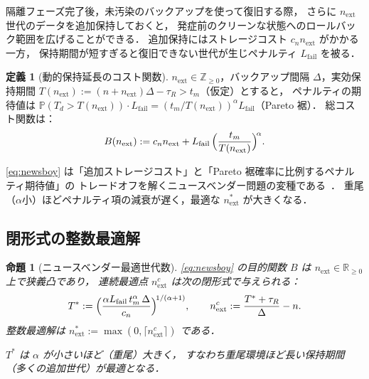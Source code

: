 \documentclass[12pt,a4paper]{article}
\theoremstyle{plain}
\newtheorem{proposition}[theorem]{命題}
\theoremstyle{definition}
\newtheorem{definition}[theorem]{定義}
\theoremstyle{remark}
\newcommand{\Prob}{\mathbb{P}}
\newcommand{\Z}{\mathbb{Z}}
\begin{document}
隔離フェーズ完了後，未汚染のバックアップを使って復旧する際，
さらに $n_{\mathrm{ext}}$ 世代のデータを追加保持しておくと，
発症前のクリーンな状態へのロールバック範囲を広げることができる．
追加保持にはストレージコスト $c_n n_{\mathrm{ext}}$ がかかる一方，
保持期間が短すぎると復旧できない世代が生じペナルティ $L_{\mathrm{fail}}$ を被る．

\begin{definition}[動的保持延長のコスト関数]\label{def:newsboy}
$n_{\mathrm{ext}}\in\Z_{\ge0}$，バックアップ間隔 $\Delta$，実効保持期間
$T(n_{\mathrm{ext}}):=(n+n_{\mathrm{ext}})\Delta-\tau_R>t_m$（仮定）とすると，
ペナルティの期待値は $\Prob(T_d>T(n_{\mathrm{ext}}))\cdot L_{\mathrm{fail}}=(t_m/T(n_{\mathrm{ext}}))^\alpha L_{\mathrm{fail}}$（Pareto 裾）．
総コスト関数は：
\begin{equation}\label{eq:newsboy}
B(n_{\mathrm{ext}}):=c_n n_{\mathrm{ext}}+L_{\mathrm{fail}}\,\Bigl(\frac{t_m}{T(n_{\mathrm{ext}})}\Bigr)^{\!\alpha}.
\end{equation}
\end{definition}

\eqref{eq:newsboy} は「追加ストレージコスト」と「Pareto 裾確率に比例するペナルティ期待値」の
トレードオフを解くニュースベンダー問題の変種である~\cite{porteus2002}．
重尾（$\alpha$小）ほどペナルティ項の減衰が遅く，最適な $n_{\mathrm{ext}}^*$ が大きくなる．

\subsection{閉形式の整数最適解}

\begin{proposition}[ニュースベンダー最適世代数]\label{prop:newsboy}
\eqref{eq:newsboy} の目的関数 $B$ は $n_{\mathrm{ext}}\in\mathbb{R}_{\ge0}$ 上で狭義凸であり，
連続最適点 $n_{\mathrm{ext}}^c$ は次の閉形式で与えられる：
\begin{equation}\label{eq:T_star}
T^*:=\Bigl(\frac{\alpha L_{\mathrm{fail}}\,t_m^\alpha\,\Delta}{c_n}\Bigr)^{\!1/(\alpha+1)},
\qquad
n_{\mathrm{ext}}^c:=\frac{T^*+\tau_R}{\Delta}-n.
\end{equation}
整数最適解は $n_{\mathrm{ext}}^*:=\max(0,\lceil n_{\mathrm{ext}}^c\rceil)$ である．

$T^*$ は $\alpha$ が小さいほど（重尾）大きく，
すなわち重尾環境ほど長い保持期間（多くの追加世代）が最適となる．
\end{proposition}
\end{document}
